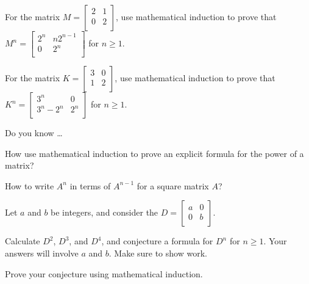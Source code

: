 \begin{exer}[\exerU] %
\label{exer_prove_power_dilationshear_matrix}
    For the matrix $M=\left[ \begin{array}{cc} 2 & 1 \\ 0 & 2 \\ \end{array} \right]$, use mathematical induction to prove that $M^n=\left[ \begin{array}{cc} 2^n & n2^{n-1}\\ 0 & 2^n \\ \end{array} \right]$ for $n\ge 1$. 
\end{exer}

\begin{exer}[\exerU] %
\label{exer_prove_power_complicated_matrix}
    For the matrix $K=\left[ \begin{array}{cc} 3 & 0 \\ 1 & 2 \\ \end{array} \right]$, use mathematical induction to prove that $K^n=\left[ \begin{array}{cc} 3^n & 0 \\ 3^n-2^n& 2^n \\ \end{array} \right]$ for $n\ge 1$. 
\end{exer}

\begin{exer}[\exerR] %
\label{exer_dyk_matrix_proof}
    Do you know \ldots
        \begin{exerpart}
            \item How use mathematical induction to prove an explicit formula for the power of a matrix? 
            \item How to write $A^n$ in terms of $A^{n-1}$ for a square matrix $A$?
        \end{exerpart}
\end{exer}

\begin{exer}[\exerE] %
\label{exer_prove_power_diagonal_matrix}
   Let $a$ and $b$ be integers, and consider the  $D=\left[ \begin{array}{cc} a & 0 \\ 0 & b \\ \end{array} \right]$.      
        \begin{exerpart}
            \item Calculate $D^2$, $D^3$, and $D^4$, and conjecture a formula for $D^n$ for $n \ge 1$. Your answers will involve $a$ and $b$. Make sure to show work. %
            \item Prove your conjecture using mathematical induction.
        \end{exerpart}
\end{exer}

